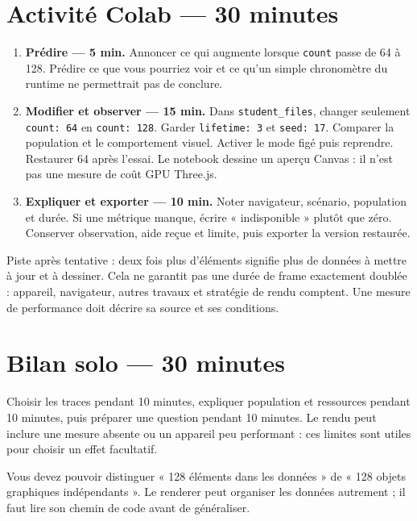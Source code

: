 \documentclass[
  canadien,
  11pt,
  a4paper,
]{report}
\providecommand{\tightlist}{%
  \setlength{\itemsep}{0pt}\setlength{\parskip}{0pt}}
\begin{document}
\section{Activité Colab --- 30
minutes}\label{activituxe9-colab-30-minutes-5}

\begin{enumerate}
\def\labelenumi{\arabic{enumi}.}
\tightlist
\item
  \textbf{Prédire --- 5 min.} Annoncer ce qui augmente lorsque
  \texttt{count} passe de 64 à 128. Prédire ce que vous pourriez voir et
  ce qu'un simple chronomètre du runtime ne permettrait pas de conclure.
\item
  \textbf{Modifier et observer --- 15 min.} Dans
  \texttt{student\_\allowbreak{}files}, changer seulement \texttt{count:\ 64} en
  \texttt{count:\ 128}. Garder \texttt{lifetime:\ 3} et
  \texttt{seed:\ 17}. Comparer la population et le comportement visuel.
  Activer le mode figé puis reprendre. Restaurer 64 après l'essai. Le
  notebook dessine un aperçu Canvas : il n'est pas une mesure de coût
  GPU Three.js.
\item
  \textbf{Expliquer et exporter --- 10 min.} Noter navigateur, scénario,
  population et durée. Si une métrique manque, écrire « indisponible »
  plutôt que zéro. Conserver observation, aide reçue et limite, puis
  exporter la version restaurée.
\end{enumerate}

Piste après tentative : deux fois plus d'éléments signifie plus de
données à mettre à jour et à dessiner. Cela ne garantit pas une durée de
frame exactement doublée : appareil, navigateur, autres travaux et
stratégie de rendu comptent. Une mesure de performance doit décrire sa
source et ses conditions.

\section{Bilan solo --- 30 minutes}\label{bilan-solo-30-minutes-5}

Choisir les traces pendant 10 minutes, expliquer population et
ressources pendant 10 minutes, puis préparer une question pendant 10
minutes. Le rendu peut inclure une mesure absente ou un appareil peu
performant : ces limites sont utiles pour choisir un effet facultatif.

Vous devez pouvoir distinguer « 128 éléments dans les données » de « 128
objets graphiques indépendants ». Le renderer peut organiser les données
autrement ; il faut lire son chemin de code avant de généraliser.
\end{document}

